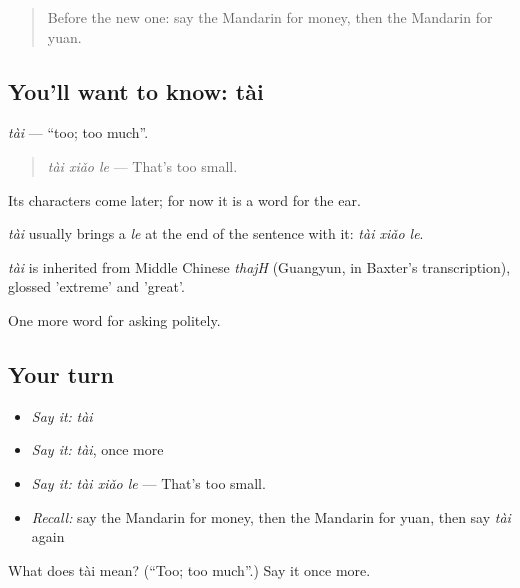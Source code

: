 \label{lesson:ZH-C41-tai}



\begin{quote}
Before the new one: say the Mandarin for money, then the Mandarin for yuan.
\end{quote}

\subsection*{You'll want to know: tài}
\emph{tài} — \textquotedblleft{}too; too much\textquotedblright{}.

\begin{quote}
\emph{tài xiǎo le} — That's too small.
\end{quote}

Its characters come later; for now it is a word for the ear.

\emph{tài} usually brings a \emph{le} at the end of the sentence with it: \emph{tài xiǎo le}.

\begin{cousinweb}
\emph{tài} is inherited from Middle Chinese \emph{thajH} (Guangyun, in Baxter's transcription), glossed 'extreme' and 'great'.
\end{cousinweb}

\begin{grammarlens}[title={What you've built}]
One more word for asking politely.
\end{grammarlens}

\subsection*{Your turn}
\begin{itemize}
\raggedright
  \item \emph{Say it:} \emph{tài}
  \item \emph{Say it:} \emph{tài}, once more
  \item \emph{Say it:} \emph{tài xiǎo le} — That's too small.
  \item \emph{Recall:} say the Mandarin for money, then the Mandarin for yuan, then say \emph{tài} again
\end{itemize}

\begin{tcolorbox}[breakable,colback=teal!4,colframe=teal!35!black,title={Before you move on}]
What does tài mean? (\textquotedblleft{}Too; too much\textquotedblright{}.) Say it once more.
\end{tcolorbox}
